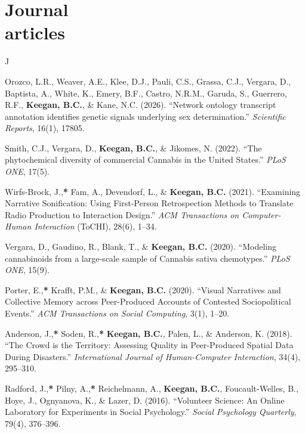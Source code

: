 \documentclass{cv}
\begin{document}
	\section{Journal\\articles}
	\begin{entries}{J}
		\item Orozco, L.R., Weaver, A.E., Klee, D.J., Pauli, C.S., Grassa, C.J., Vergara, D., Baptista, A., White, K., Emery, B.F., Castro, N.R.M., Garuda, S., Guerrero, R.F., \textbf{Keegan, B.C.}, \& Kane, N.C. (2026). ``Network ontology transcript annotation identifies genetic signals underlying sex determination.'' \textit{Scientific Reports}, 16(1), 17805. 
		\item Smith, C.J., Vergara, D., \textbf{Keegan, B.C.}, \& Jikomes, N. (2022). ``The phytochemical diversity of commercial Cannabis in the United States.'' \textit{PLoS ONE}, 17(5). 
		\item Wirfs-Brock, J.,\textbf{*} Fam, A., Devendorf, L., \& \textbf{Keegan, B.C.} (2021). ``Examining Narrative Sonification: Using First-Person Retrospection Methods to Translate Radio Production to Interaction Design.'' \textit{ACM Transactions on Computer-Human Interaction} (ToCHI), 28(6), 1--34. 
		\item Vergara, D., Gaudino, R., Blank, T., \& \textbf{Keegan, B.C.} (2020). ``Modeling cannabinoids from a large-scale sample of Cannabis sativa chemotypes.'' \textit{PLoS ONE}, 15(9). 
		\item Porter, E.,\textbf{*} Krafft, P.M., \& \textbf{Keegan, B.C.} (2020). ``Visual Narratives and Collective Memory across Peer-Produced Accounts of Contested Sociopolitical Events.'' \textit{ACM Transactions on Social Computing}, 3(1), 1--20. 
		\item Anderson, J.,\textbf{*} Soden, R.,\textbf{*} \textbf{Keegan, B.C.}, Palen, L., \& Anderson, K. (2018). ``The Crowd is the Territory: Assessing Quality in Peer-Produced Spatial Data During Disasters.'' \textit{International Journal of Human-Computer Interaction}, 34(4), 295--310. 
		\item Radford, J.,\textbf{*} Pilny, A.,\textbf{*} Reichelmann, A., \textbf{Keegan, B.C.}, Foucault-Welles, B., Hoye, J., Ognyanova, K., \& Lazer, D. (2016). ``Volunteer Science: An Online Laboratory for Experiments in Social Psychology.'' \textit{Social Psychology Quarterly}, 79(4), 376--396. 

\end{entries}
\end{document}
